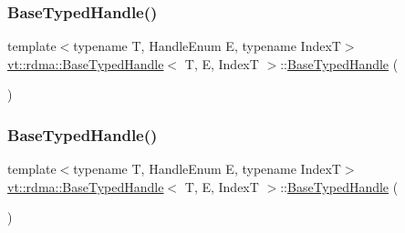 \mbox{\label{structvt_1_1rdma_1_1_base_typed_handle_adfa889759392da4cdcea27e79e81a12f}} 
\subsubsection{\texorpdfstring{Base\+Typed\+Handle()}{BaseTypedHandle()}\hspace{0.1cm}{\footnotesize\ttfamily [2/4]}}
{\footnotesize\ttfamily template$<$typename T, Handle\+Enum E, typename IndexT$>$ \\
\hyperlink{structvt_1_1rdma_1_1_base_typed_handle}{vt\+::rdma\+::\+Base\+Typed\+Handle}$<$ T, E, IndexT $>$\+::\hyperlink{structvt_1_1rdma_1_1_base_typed_handle}{Base\+Typed\+Handle} (\begin{DoxyParamCaption}\item[{\hyperlink{structvt_1_1rdma_1_1_base_typed_handle}{Base\+Typed\+Handle}$<$ T, E, IndexT $>$ const \&}]{ }\end{DoxyParamCaption})\hspace{0.3cm}{\ttfamily [default]}}

\mbox{\label{structvt_1_1rdma_1_1_base_typed_handle_a89f1a34092464da223bc474deca0692e}} 
\subsubsection{\texorpdfstring{Base\+Typed\+Handle()}{BaseTypedHandle()}\hspace{0.1cm}{\footnotesize\ttfamily [3/4]}}
{\footnotesize\ttfamily template$<$typename T, Handle\+Enum E, typename IndexT$>$ \\
\hyperlink{structvt_1_1rdma_1_1_base_typed_handle}{vt\+::rdma\+::\+Base\+Typed\+Handle}$<$ T, E, IndexT $>$\+::\hyperlink{structvt_1_1rdma_1_1_base_typed_handle}{Base\+Typed\+Handle} (\begin{DoxyParamCaption}\item[{\hyperlink{structvt_1_1rdma_1_1_base_typed_handle}{Base\+Typed\+Handle}$<$ T, E, IndexT $>$ \&\&}]{ }\end{DoxyParamCaption})\hspace{0.3cm}{\ttfamily [default]}}

